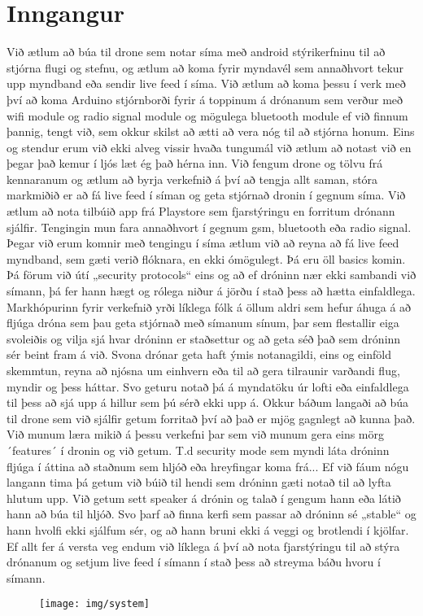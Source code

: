 \section{Inngangur}
Við ætlum að búa til drone sem notar síma með android stýrikerfninu til að stjórna flugi og stefnu, og ætlum að koma fyrir myndavél sem annaðhvort tekur upp myndband eða sendir live feed í síma.
Við ætlum að koma þessu í verk með því að koma Arduino stjórnborði fyrir á toppinum á drónanum sem verður með wifi module og radio signal module  og mögulega bluetooth module ef við finnum þannig, tengt við, sem okkur skilst að ætti að vera nóg til að stjórna honum. Eins og stendur erum við ekki alveg vissir hvaða tungumál við ætlum að notast við en þegar það kemur í ljós læt ég það hérna inn. 
Við fengum drone og tölvu frá kennaranum og ætlum að byrja verkefnið á því að tengja allt saman, stóra markmiðið er að fá live feed í síman og geta stjórnað dronin í gegnum síma. Við ætlum að nota tilbúið app frá Playstore sem fjarstýringu en forritum drónann sjálfir. Tengingin mun fara annaðhvort í gegnum gsm, bluetooth eða radio signal. Þegar við erum komnir með tengingu í síma ætlum við að reyna að fá live feed myndband, sem gæti verið flóknara, en ekki ómögulegt. Þá eru öll basics komin. Þá förum við útí „security protocols“ eins og að ef dróninn nær ekki sambandi við símann, þá fer hann hægt og rólega niður á jörðu í stað þess að hætta einfaldlega.
Markhópurinn fyrir verkefnið yrði líklega fólk á öllum aldri sem hefur áhuga á að fljúga dróna sem þau geta stjórnað með símanum sínum, þar sem flestallir eiga svoleiðis og vilja sjá hvar dróninn er staðsettur og að geta séð það sem dróninn sér beint fram á við. 
Svona drónar geta haft ýmis notanagildi, eins og einföld skemmtun, reyna að njósna um einhvern eða til að gera tilraunir varðandi flug, myndir og þess háttar. Svo geturu notað þá á myndatöku úr lofti eða einfaldlega til þess að sjá upp á hillur sem þú sérð ekki upp á.
Okkur báðum langaði að búa til drone sem við sjálfir getum forritað því að það er mjög gagnlegt að kunna það. Við munum læra mikið á þessu verkefni þar sem við munum gera eins mörg ´features´ í dronin og við getum. T.d security mode sem myndi láta dróninn fljúga í áttina að staðnum sem hljóð eða hreyfingar koma frá... Ef við fáum nógu langann tima þá getum við búið til hendi sem dróninn gæti notað til að lyfta hlutum upp. Við getum sett speaker á drónin og talað í gengum hann eða látið hann að búa til hljóð. Svo þarf að finna kerfi sem passar að dróninn sé „stable“ og hann hvolfi ekki sjálfum sér, og að hann bruni ekki á veggi og brotlendi í kjölfar. 
Ef allt fer á versta veg endum við líklega á því að nota fjarstýringu til að stýra drónanum og setjum live feed í símann í stað þess að streyma báðu hvoru í símann.

\begin{figure}[h]
\texttt{[image: img/system]}
\end{figure}
